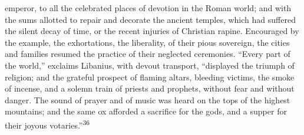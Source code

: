 emperor, to all the celebrated places of devotion in the Roman
world; and with the sums allotted to repair and decorate the
ancient temples, which had suffered the silent decay of time, or
the recent injuries of Christian rapine. Encouraged by the
example, the exhortations, the liberality, of their pious
sovereign, the cities and families resumed the practice of their
neglected ceremonies. “Every part of the world,” exclaims
Libanius, with devout transport, “displayed the triumph of
religion; and the grateful prospect of flaming altars, bleeding
victims, the smoke of incense, and a solemn train of priests and
prophets, without fear and without danger. The sound of prayer
and of music was heard on the tops of the highest mountains; and
the same ox afforded a sacrifice for the gods, and a supper for
their joyous votaries.”\textsuperscript{36}


